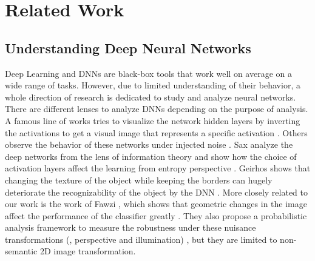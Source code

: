 \section{Related Work}
\subsection{Understanding Deep Neural Networks}
 Deep Learning and DNNs are black-box tools that work well on average on a wide range of tasks. However, due to limited understanding of their behavior, a whole direction of research is dedicated to study and analyze neural networks. There are different lenses to analyze DNNs depending on the purpose of analysis. A famous line of works tries to visualize the network hidden layers by inverting the activations to get a visual image that represents a specific activation  \cite{unn-visual1,unn-visual2,unn-visual3}. Others observe the behavior of these networks under injected noise \cite{unn-robustness-noise1,unn-robustness-noise2,unn-robustness-noise3,unn-robustness-noise4,unn-robustness-noise5,unn-modar}. Sax \etal analyze the deep networks from the lens of information theory and show how the choice of activation layers affect the learning from entropy perspective \cite{info-lense}. Geirhos \etal shows that changing the texture of the object while keeping the borders can hugely deteriorate the recognizability of the object by the DNN \cite{unn-texture}. More closely related to our work is the work of Fawzi \etal, which shows that geometric changes in the image affect the performance of the classifier greatly \cite{unn-robustness-geometry}. They also propose a probabilistic analysis framework to measure the robustness under these nuisance transformations (\eg, perspective and illumination) \cite{unn-robustness-measure}, but they are limited to non-semantic 2D image transformation. 
